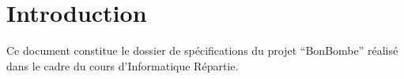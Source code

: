 \section{Introduction}
Ce document constitue le dossier de spécifications du projet ``BonBombe'' réalisé dans le cadre du cours d'Informatique Répartie.
